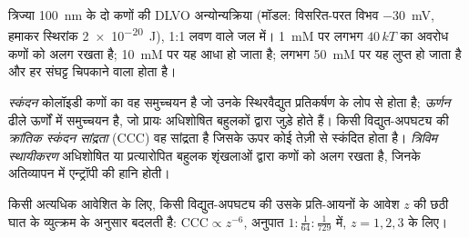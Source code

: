 \begin{omfigure}

{\small त्रिज्या \qty{100}{nm} के दो कणों की DLVO अन्योन्यक्रिया (मॉडल: विसरित-परत
विभव \qty{-30}{mV}, हमाकर स्थिरांक \qty{2e-20}{J}), 1:1 लवण वाले जल में। \qty{1}{mM} पर
लगभग $40\,kT$ का अवरोध कणों को अलग रखता है; \qty{10}{mM} पर यह आधा हो जाता है;
लगभग \qty{50}{mM} पर यह लुप्त हो जाता है और हर संघट्ट चिपकाने वाला होता है।}
\end{omfigure}

\begin{definition}[स्कंदन और स्थायीकरण]\label{def:b3:colloids:stability}
\emph{स्कंदन} कोलॉइडी कणों का वह समुच्चयन है जो उनके
स्थिरवैद्युत प्रतिकर्षण के लोप से होता है; \emph{ऊर्णन}
ढीले ऊर्णों में समुच्चयन है, जो प्रायः अधिशोषित बहुलकों द्वारा जुड़े होते हैं।
किसी विद्युत-अपघट्य की \emph{क्रांतिक स्कंदन सांद्रता}
(CCC) वह सांद्रता है जिसके ऊपर कोई
 तेज़ी से स्कंदित होता है। \emph{त्रिविम स्थायीकरण}
अधिशोषित या प्रत्यारोपित बहुलक शृंखलाओं द्वारा कणों को अलग रखता है,
जिनके अतिव्यापन में एन्ट्रॉपी की हानि होती।
\end{definition}

\begin{proposition}[शुल्त्से--हार्डी नियम]\label{prop:b3:colloids:schulze-hardy}
किसी अत्यधिक आवेशित  के लिए, किसी विद्युत-अपघट्य की 
उसके प्रति-आयनों के आवेश $z$ की छठी घात के व्युत्क्रम के अनुसार बदलती है:
$\text{CCC} \propto z^{-6}$, अनुपात $1 : \frac{1}{64} : \frac{1}{729}$ में, $z = 1, 2, 3$ के लिए।
\end{proposition}

